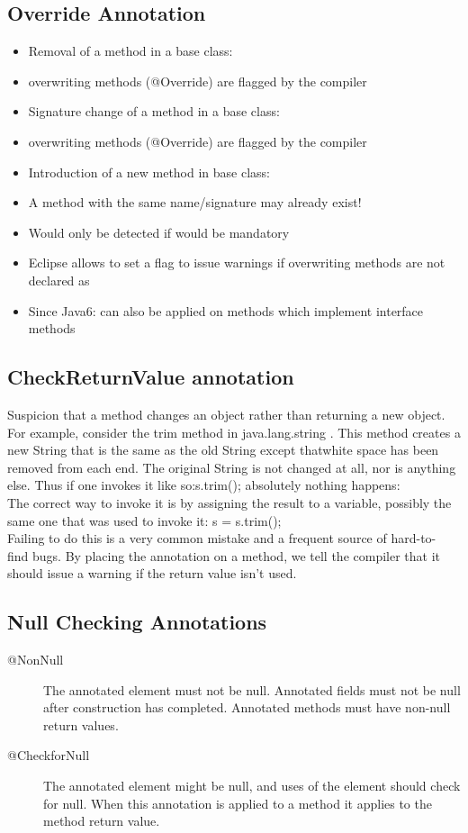 \documentclass[a4paper,10pt]{scrreprt}
\begin{document}
\subsection{Override Annotation}
\begin{itemize}
 \item Removal of a method in a base class:
\item overwriting methods (@Override) are flagged by the compiler
\item  Signature change of a method in a base class:
\item  overwriting methods (@Override) are flagged by the compiler
\item  Introduction of a new method in base class:
\item  A method with the same name/signature may already exist!
\item Would only be detected if
would be mandatory
\item Eclipse allows to set a flag to issue warnings if overwriting methods are
not declared as
\item  Since Java6: can also be applied on methods which implement interface
methods
\end{itemize}

\subsection{CheckReturnValue annotation}
 Suspicion that a method changes an object rather than returning a new object.\\
For example, consider the trim method in java.lang.string . This method creates a new String that is the same as the 
old 
String except thatwhite space has been removed from each end. The original String is not
changed at all, nor is anything else. Thus if one invokes it like so:s.trim();
absolutely nothing happens:\\

The correct way to invoke it is by assigning the result to a variable, possibly the same one that was used to invoke 
it: 
s = s.trim();\\
Failing to do this is a very common mistake and a frequent source of hard-to-
find bugs. By placing the annotation on a method, we tell the compiler that it should issue a warning if the return 
value isn't used.

\subsection{Null Checking Annotations}
\begin{description}
 \item [@NonNull] The annotated element must not be null. Annotated fields must not be null
after construction has completed. Annotated methods must have non-null
return values.
 \item [@CheckforNull] The annotated element might be null, and uses of the element should check
for null. When this annotation is applied to a method it applies to the method
return value.
\end{description}
\end{document}
